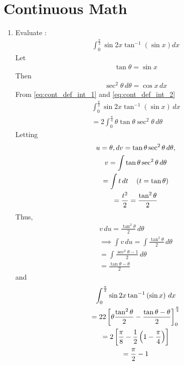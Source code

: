 \documentclass[journal,12pt,twocolumn]{IEEEtran}
\renewcommand\thesection{\arabic{section}}
\begin{document}
\section{Continuous Math}
\begin{enumerate}[label=\thesection.\arabic*.,ref=\thesection.\theenumi]
 \item Evaluate : \begin{align} \int_{0}^{\frac{\pi}{2}} \sin2x \tan^{-1}  \left(\sin x\right)dx \nonumber \end{align}
		 \solution Let 
		 \begin{align}
			 \label{eq:cont_def_int_1}
			 \tan \theta = \sin x
		 \end{align}
		 Then 
		 \begin{align}
			 \label{eq:cont_def_int_2}
			 \sec^2  \theta \, d\theta= \cos x \, dx
		 \end{align}
			 From \eqref{eq:cont_def_int_1} and 
			 \eqref{eq:cont_def_int_2}
 \begin{multline} 
 \int_{0}^{\frac{\pi}{2}} \sin2x \tan^{-1}  \left(\sin x\right)\, dx  
 \\
	 =
2 \int_{0}^{\frac{\pi}{4}}  \theta \tan \theta \sec^2\theta \, d\theta
 \end{multline}
 Letting 
 \begin{multline} 
	 u = \theta , dv = \tan \theta \sec^2\theta \, d\theta, 
	 \\
	 v = \int \tan \theta \sec^2\theta \, d\theta 
	 \\
	  = \int t \, dt \quad \left(t = \tan \theta \right)
	  \\
	  = \frac{t^2}{2} = \frac{\tan^2 \theta }{2}
 \end{multline}
 Thus, 
 \begin{multline} 
v\,du 
	 =   \frac{\tan^2\theta }{2}\, d\theta
	 \\
	 \implies \int v\, du = \int \frac{\tan^2\theta }{2}\, d\theta
	 \\
	 = \int \frac{\sec^2\theta -1 }{2}\, d\theta
	 \\
	 =  \frac{\tan \theta - \theta}{2}
 \end{multline}
 and
 \begin{multline} 
 \int_{0}^{\frac{\pi}{2}} \sin2x \tan^{-1}  \left(\sin x\right)\, dx  
 \\
	 = 22{}\left[\theta \frac{\tan^2\theta}{2} -  \frac{\tan \theta - \theta}{2} \right]_{0}^{\frac{\pi}{4}}
	 \\
	 = 2{}\left[\frac{\pi}{8} - \frac{1}{2}\left(1-\frac{\pi}{4}\right)\right]
	 \\
	 =\frac{\pi}{2}-1
 \end{multline}


\end{enumerate}
\end{document}
